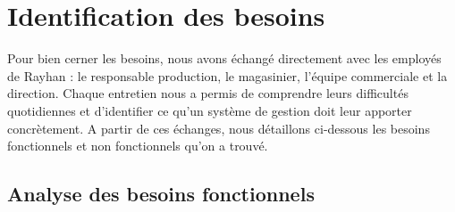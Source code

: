 \section{Identification des besoins}
Pour bien cerner les besoins, nous avons échangé directement avec les employés de Rayhan : le responsable production, le magasinier, l'équipe commerciale et la direction. Chaque entretien nous a permis de comprendre leurs difficultés quotidiennes et d'identifier ce qu'un système de gestion doit leur apporter concrètement. A partir de ces échanges, nous détaillons ci-dessous les besoins fonctionnels et non fonctionnels qu'on a trouvé.\par

\subsection{Analyse des besoins fonctionnels}
